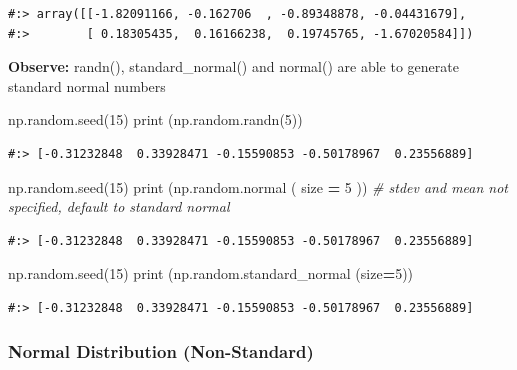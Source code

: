 \documentclass[
]{book}
\newenvironment{Shaded}{\begin{snugshade}}{\end{snugshade}}
\newcommand{\BuiltInTok}[1]{#1}
\newcommand{\CommentTok}[1]{\textcolor[rgb]{0.37,0.37,0.37}{\textit{#1}}}
\newcommand{\DecValTok}[1]{\textcolor[rgb]{0.06,0.06,0.06}{#1}}
\newcommand{\NormalTok}[1]{#1}
\newcommand{\OperatorTok}[1]{\textcolor[rgb]{0.43,0.43,0.43}{\textbf{#1}}}
\begin{document}
\begin{verbatim}
#:> array([[-1.82091166, -0.162706  , -0.89348878, -0.04431679],
#:>        [ 0.18305435,  0.16166238,  0.19745765, -1.67020584]])
\end{verbatim}

\textbf{Observe:} randn(), standard\_normal() and normal() are able to generate standard normal numbers

\begin{Shaded}
\begin{Highlighting}[]
\NormalTok{np.random.seed(}\DecValTok{15}\NormalTok{)}
\BuiltInTok{print}\NormalTok{ (np.random.randn(}\DecValTok{5}\NormalTok{))}
\end{Highlighting}
\end{Shaded}

\begin{verbatim}
#:> [-0.31232848  0.33928471 -0.15590853 -0.50178967  0.23556889]
\end{verbatim}

\begin{Shaded}
\begin{Highlighting}[]
\NormalTok{np.random.seed(}\DecValTok{15}\NormalTok{)}
\BuiltInTok{print}\NormalTok{ (np.random.normal ( size }\OperatorTok{=} \DecValTok{5}\NormalTok{ )) }\CommentTok{# stdev and mean not specified, default to standard normal}
\end{Highlighting}
\end{Shaded}

\begin{verbatim}
#:> [-0.31232848  0.33928471 -0.15590853 -0.50178967  0.23556889]
\end{verbatim}

\begin{Shaded}
\begin{Highlighting}[]
\NormalTok{np.random.seed(}\DecValTok{15}\NormalTok{)}
\BuiltInTok{print}\NormalTok{ (np.random.standard_normal (size}\OperatorTok{=}\DecValTok{5}\NormalTok{))}
\end{Highlighting}
\end{Shaded}

\begin{verbatim}
#:> [-0.31232848  0.33928471 -0.15590853 -0.50178967  0.23556889]
\end{verbatim}

\hypertarget{normal-distribution-non-standard}{%
\subsubsection{Normal Distribution (Non-Standard)}\label{normal-distribution-non-standard}}
\end{document}
